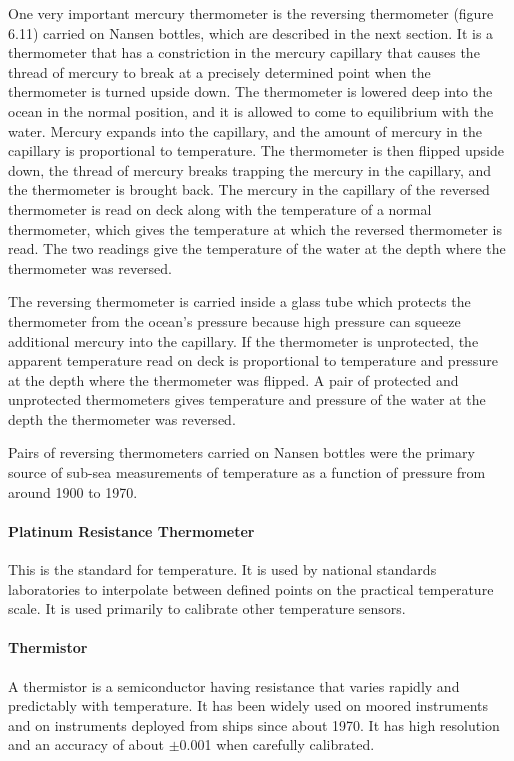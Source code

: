One very important mercury thermometer is the reversing
thermometer (figure 6.11) carried on
Nansen bottles, which are described in the next section. It is a
thermometer that has a constriction in the mercury capillary that
causes the thread of mercury to break at a precisely determined point
when the thermometer is turned upside down. The thermometer is lowered
deep into the ocean in the normal position, and it is allowed to come
to equilibrium with the water. Mercury expands into the capillary, and
the amount of mercury in the capillary is proportional to
temperature. The thermometer is then flipped upside down, the thread
of mercury breaks trapping the mercury in the capillary, and the
thermometer is brought back. The mercury in the capillary of the
reversed thermometer is read on deck along with the temperature of a
normal thermometer, which gives the temperature at which the reversed
thermometer is read. The two readings give the temperature of the
water at the depth where the thermometer was reversed.

The reversing thermometer is carried
inside a glass tube which protects the thermometer from the ocean's
pressure because high pressure can squeeze additional mercury into the
capillary. If the thermometer is unprotected, the apparent temperature
read on deck is proportional to temperature and pressure at the depth
where the thermometer was flipped. A pair of protected and unprotected
thermometers gives temperature and pressure of the water at the depth
the thermometer was reversed.

Pairs of reversing thermometers carried
on Nansen bottles were the primary source of sub-sea measurements of
temperature as a function of pressure from around 1900 to 1970.

\paragraph{Platinum Resistance Thermometer} This is the standard for temperature.
It is used by national standards laboratories to
interpolate between defined points on the practical temperature
scale. It is used primarily to calibrate other temperature sensors.

\paragraph{Thermistor} A thermistor is a semiconductor having
resistance that varies rapidly and
predictably with temperature. It has been widely used on moored
instruments and on instruments deployed from ships since about 1970.
It has high resolution and an
accuracy of about
$\pm$0.001 when carefully calibrated.

